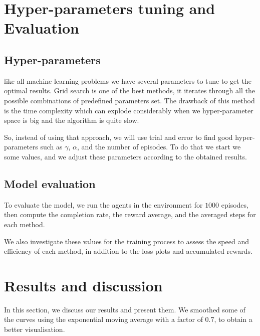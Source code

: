 \section{Hyper-parameters tuning and Evaluation}\label{sec5}
\subsection{Hyper-parameters}
like all machine learning problems we have several parameters to tune to get the optimal results. Grid search is one of the best methods, it iterates through all the possible combinations of predefined parameters set. The drawback of this method is the time complexity which can explode considerably when we hyper-parameter space is big and the algorithm is quite slow.

So, instead of using that approach, we will use trial and error to find good hyper-parameters such as $\gamma$, $\alpha$, and the number of episodes. To do that we start we some values, and we adjust these parameters according to the obtained results.

\subsection{Model evaluation}
To evaluate the model, we run the agents in the environment for $1000$ episodes, then compute the completion rate, the reward average, and the averaged steps for each method.

We also investigate these values for the training process to assess the speed and efficiency of each method, in addition to the loss plots and accumulated rewards.
\section{Results and discussion}\label{sec6}
In this section, we discuss our results and present them. We smoothed some of the curves using the exponential moving average with a factor of $0.7$, to obtain a better visualisation.
